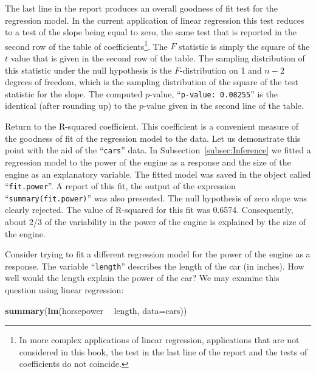 \documentclass[]{krantz}
\makeatletter
\newenvironment{Shaded}{\begin{snugshade}}{\end{snugshade}}
\newcommand{\DataTypeTok}[1]{\textcolor[rgb]{0.13,0.29,0.53}{#1}}
\newcommand{\KeywordTok}[1]{\textcolor[rgb]{0.13,0.29,0.53}{\textbf{#1}}}
\newcommand{\NormalTok}[1]{#1}
\newcommand{\OperatorTok}[1]{\textcolor[rgb]{0.81,0.36,0.00}{\textbf{#1}}}
\newcommand{\StringTok}[1]{\textcolor[rgb]{0.31,0.60,0.02}{#1}}
\newenvironment{kframe}{%
\medskip{}
\setlength{\fboxsep}{.8em}
 \def\at@end@of@kframe{}%
 \ifinner\ifhmode%
  \def\at@end@of@kframe{\end{minipage}}%
  \begin{minipage}{\columnwidth}%
 \fi\fi%
 \def\FrameCommand##1{\hskip\@totalleftmargin \hskip-\fboxsep
 \colorbox{shadecolor}{##1}\hskip-\fboxsep
     \hskip-\linewidth \hskip-\@totalleftmargin \hskip\columnwidth}%
 \MakeFramed {\advance\hsize-\width
   \@totalleftmargin\z@ \linewidth\hsize
   \@setminipage}}%
 {\par\unskip\endMakeFramed%
 \at@end@of@kframe}
\renewenvironment{Shaded}{\begin{kframe}}{\end{kframe}}
\theoremstyle{definition}
\theoremstyle{definition}
\theoremstyle{definition}
\theoremstyle{remark}
\makeatother
\begin{document}
The last line in the report produces an overall goodness of fit test for
the regression model. In the current application of linear regression
this test reduces to a test of the slope being equal to zero, the same
test that is reported in the second row of the table of
coefficients\footnote{In more complex applications of linear regression, applications
  that are not considered in this book, the test in the last line of
  the report and the tests of coefficients do not coincide.}. The \(F\) statistic is simply the square of the \(t\)
value that is given in the second row of the table. The sampling
distribution of this statistic under the null hypothesis is the
\(F\)-distribution on 1 and \(n-2\) degrees of freedom, which is the
sampling distribution of the square of the test statistic for the slope.
The computed \(p\)-value, ``\texttt{p-value:\ 0.08255}'' is the identical (after
rounding up) to the \(p\)-value given in the second line of the table.

Return to the R-squared coefficient. This coefficient is a convenient
measure of the goodness of fit of the regression model to the data. Let
us demonstrate this point with the aid of the ``\texttt{cars}'' data. In
Subsection~\ref{subsec:Inference} we fitted a regression model to
the power of the engine as a response and the size of the engine as an
explanatory variable. The fitted model was saved in the object called
``\texttt{fit.power}''. A report of this fit, the output of the expression
``\texttt{summary(fit.power)}'' was also presented. The null hypothesis of zero
slope was clearly rejected. The value of R-squared for this fit was
0.6574. Consequently, about 2/3 of the variability in the power of the
engine is explained by the size of the engine.

Consider trying to fit a different regression model for the power of the
engine as a response. The variable ``\texttt{length}'' describes the length of
the car (in inches). How well would the length explain the power of the
car? We may examine this question using linear regression:

\begin{Shaded}
\begin{Highlighting}[]
\KeywordTok{summary}\NormalTok{(}\KeywordTok{lm}\NormalTok{(horsepower }\OperatorTok{~}\StringTok{ }\NormalTok{length, }\DataTypeTok{data=}\NormalTok{cars))}
\end{Highlighting}
\end{Shaded}
\end{document}
